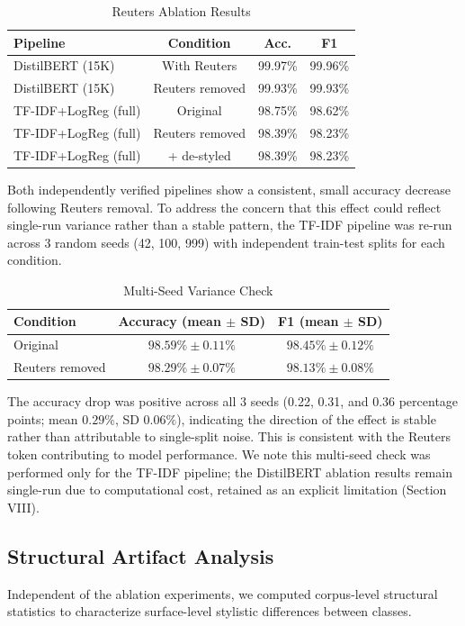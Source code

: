 \documentclass[conference]{IEEEtran}
\begin{document}
\begin{table}[!t]
\caption{Reuters Ablation Results}
\centering
\begin{tabular}{lccc}
\toprule
Pipeline & Condition & Acc. & F1 \\
\midrule
DistilBERT (15K) & With Reuters & 99.97\% & 99.96\% \\
DistilBERT (15K) & Reuters removed & 99.93\% & 99.93\% \\
TF-IDF+LogReg (full) & Original & 98.75\% & 98.62\% \\
TF-IDF+LogReg (full) & Reuters removed & 98.39\% & 98.23\% \\
TF-IDF+LogReg (full) & + de-styled & 98.39\% & 98.23\% \\
\bottomrule
\end{tabular}
\end{table}

Both independently verified pipelines show a consistent, small accuracy decrease following Reuters removal. To address the concern that this effect could reflect single-run variance rather than a stable pattern, the TF-IDF pipeline was re-run across 3 random seeds (42, 100, 999) with independent train-test splits for each condition.

\begin{table}[!t]
\caption{Multi-Seed Variance Check}
\centering
\begin{tabular}{lcc}
\toprule
Condition & Accuracy (mean $\pm$ SD) & F1 (mean $\pm$ SD) \\
\midrule
Original & $98.59\% \pm 0.11\%$ & $98.45\% \pm 0.12\%$ \\
Reuters removed & $98.29\% \pm 0.07\%$ & $98.13\% \pm 0.08\%$ \\
\bottomrule
\end{tabular}
\end{table}

The accuracy drop was positive across all 3 seeds (0.22, 0.31, and 0.36 percentage points; mean $0.29\%$, SD $0.06\%$), indicating the direction of the effect is stable rather than attributable to single-split noise. This is consistent with the Reuters token contributing to model performance. We note this multi-seed check was performed only for the TF-IDF pipeline; the DistilBERT ablation results remain single-run due to computational cost, retained as an explicit limitation (Section VIII).

\subsection{Structural Artifact Analysis}
Independent of the ablation experiments, we computed corpus-level structural statistics to characterize surface-level stylistic differences between classes.
\end{document}
